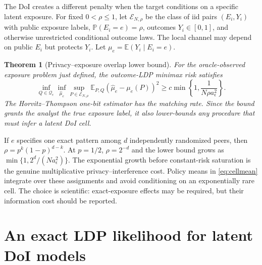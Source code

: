 \documentclass[11pt]{article}
\newtheorem{theorem}{Theorem}
\theoremstyle{definition}
\theoremstyle{remark}
\newcommand{\E}{\mathbb{E}}
\newcommand{\Pp}{\mathbb{P}}
\newcommand{\doisig}{a_{\epsilon}}
\begin{document}
The DoI creates a different penalty when the target conditions on a specific latent exposure.
For fixed $0<\rho\le1$, let $\mathcal E_{N,\rho}$ be the class of iid pairs $(E_i,Y_i)$ with
public exposure labels,
$\Pp(E_i=e)=\rho$, outcomes $Y_i\in[0,1]$, and otherwise unrestricted conditional outcome
laws. The local channel may depend on public $E_i$ but protects $Y_i$. Let
$\mu_e=\E(Y_i\mid E_i=e)$.

\begin{theorem}[Privacy--exposure overlap lower bound]
\label{thm:overlap}
For the oracle-observed exposure problem just defined, the outcome-LDP minimax risk satisfies
\begin{equation}
  \inf_{Q\in\mathcal Q_{\epsilon}}\inf_{\widehat\mu_e}
  \sup_{P\in\mathcal E_{N,\rho}}\E_{P,Q}(\widehat\mu_e-\mu_e(P))^2
  \ge c\min\!\left\{1,\frac{1}{N\rho\doisig^2}\right\}.
  \label{eq:overlap}
\end{equation}
The Horvitz--Thompson one-bit estimator has the matching rate. Since the bound grants the
analyst the true exposure label, it also lower-bounds any procedure that must infer a latent
DoI cell.
\end{theorem}

If $e$ specifies one exact pattern among $d$ independently randomized peers, then
$\rho=p^k(1-p)^{d-k}$. At $p=1/2$, $\rho=2^{-d}$ and the lower bound grows as
$\min\{1,2^d/(N\doisig^2)\}$. The exponential growth before constant-risk saturation is the
genuine multiplicative privacy--interference cost. Policy
means in \eqref{eq:cellmean} integrate over these assignments and avoid conditioning on an
exponentially rare cell. The choice is scientific: exact-exposure effects may be required, but
their information cost should be reported.

\section{An exact LDP likelihood for latent DoI models}
\label{sec:doi}
\end{document}
